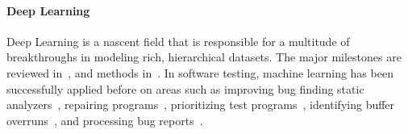 













\paragraph{Deep Learning}
Deep Learning is a nascent field that is responsible for a multitude of breakthroughs in modeling rich, hierarchical datasets. The major milestones are reviewed in~\cite{Wang2017}, and methods in~\cite{Schmidhuber2014}. In software testing,
machine learning has been successfully applied before on areas such as improving bug finding static analyzers~\cite{Heo2017,Koc2017}, repairing programs~\cite{Koukoutos2017a,White}, prioritizing test programs~\cite{Chen2017}, identifying buffer overruns~\cite{Choi2016}, and processing bug reports~\cite{Lam2016,Huo2016}.


